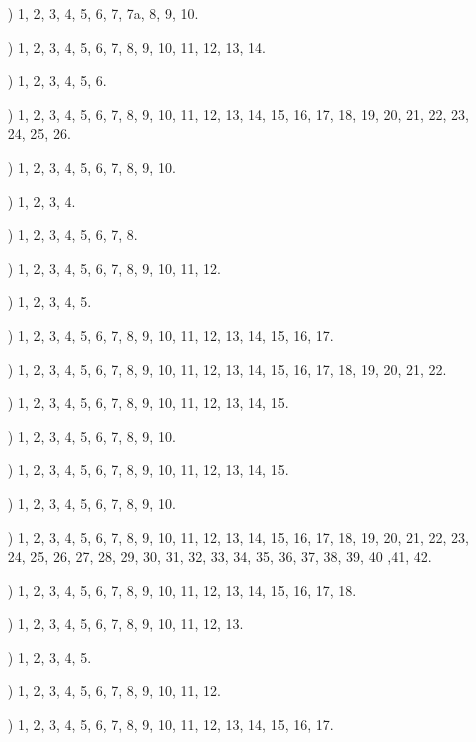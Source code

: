 \documentclass[a4paper,11pt]{article}
\numberwithin{equation}{section}
\begin{document}
\begin{itemize}

\item[\romannumeral1)] 1, 2, 3, 4, 5, 6, 7, 7a, 8, 9, 10.

\item[\romannumeral2)] 1, 2, 3, 4, 5, 6, 7, 8, 9, 10, 11, 12, 13, 14.

\item[\romannumeral3)] 1, 2, 3, 4, 5, 6.

\item[\romannumeral4)] 1, 2, 3, 4, 5, 6, 7, 8, 9, 10, 11, 12, 13, 14, 15,
  16, 17, 18, 19, 20, 21, 22, 23, 24, 25, 26.

\item[\romannumeral5)] 1, 2, 3, 4, 5, 6, 7, 8, 9, 10.

\item[\romannumeral6)] 1, 2, 3, 4.

\item[\romannumeral7)] 1, 2, 3, 4, 5, 6, 7, 8.

\item[\romannumeral8)] 1, 2, 3, 4, 5, 6, 7, 8, 9, 10, 11, 12.

\item[\romannumeral9)] 1, 2, 3, 4, 5.

\item[\romannumeral10)] 1, 2, 3, 4, 5, 6, 7, 8, 9, 10, 11, 12, 13, 14, 15,
  16, 17.

\item[\romannumeral11)] 1, 2, 3, 4, 5, 6, 7, 8, 9, 10, 11, 12, 13, 14, 15,
  16, 17, 18, 19, 20, 21, 22.

\item[\romannumeral12)] 1, 2, 3, 4, 5, 6, 7, 8, 9, 10, 11, 12, 13, 14, 15.

\item[\romannumeral13)] 1, 2, 3, 4, 5, 6, 7, 8, 9, 10.

\item[\romannumeral14)] 1, 2, 3, 4, 5, 6, 7, 8, 9, 10, 11, 12, 13, 14, 15.

\item[\romannumeral15)] 1, 2, 3, 4, 5, 6, 7, 8, 9, 10.

\item[\romannumeral16)] 1, 2, 3, 4, 5, 6, 7, 8, 9, 10, 11, 12, 13, 14, 15,
  16, 17, 18, 19, 20, 21, 22, 23, 24, 25, 26, 27, 28, 29, 30, 31, 32, 33,
  34, 35, 36, 37, 38, 39, 40 ,41, 42.

\item[\romannumeral17)] 1, 2, 3, 4, 5, 6, 7, 8, 9, 10, 11, 12, 13, 14, 15,
  16, 17, 18.

\item[\romannumeral18)] 1, 2, 3, 4, 5, 6, 7, 8, 9, 10, 11, 12, 13.

\item[\romannumeral19)] 1, 2, 3, 4, 5.

\item[\romannumeral20)] 1, 2, 3, 4, 5, 6, 7, 8, 9, 10, 11, 12.

\item[\romannumeral20)] 1, 2, 3, 4, 5, 6, 7, 8, 9, 10, 11, 12, 13, 14, 15,
  16, 17.

\end{itemize}
\end{document}
